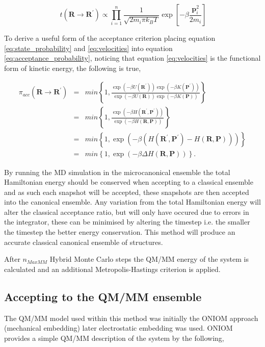 \begin{equation} \label{eq:velocities}
\ t(\textbf{R}\rightarrow\textbf{R}^{\prime}) \propto \prod_{i=1}^{n} \frac{1}{\sqrt{2 m_i \pi k_B T}} \exp \left[ -\beta \frac{\textbf{p}_{i}^2}{2m_i} \right]
\end{equation}

To derive a useful form of the acceptance criterion placing equation \ref{eq:state_probability} and \ref{eq:velocities} into equation \ref{eq:acceptance_probability}, noticing that equation \ref{eq:velocities} is the functional form of kinetic energy, the following is true,

\begin{eqnarray}
\pi_{acc}(\textbf{R}\rightarrow\textbf{R}^{\prime}) &=& min \left\{ 1, \frac{\exp (-\beta U(\textbf{R}^\prime))\exp(-\beta K(\textbf{P}^\prime))}{\exp (-\beta U(\textbf{R}))\exp(-\beta K(\textbf{P}))} \right\} \nonumber \\
&=&min \left\{ 1, \frac{\exp (-\beta H(\textbf{R}^\prime,\textbf{P}^\prime))}{\exp (-\beta H(\textbf{R},\textbf{P}))} \right\} \nonumber \\
\ &=&  min \left\{ 1, \exp (-\beta (H(\textbf{R}^\prime,\textbf{P}^\prime)-H(\textbf{R},\textbf{P}))) \right\} \nonumber \\ \label{eq:hamiltonian_acceptance}
\ &=& min \left\{1,\exp(-\beta\Delta H(\textbf{R},\textbf{P})) \right\} .
\end{eqnarray}

By running the MD simulation in the microcanonical ensemble the total Hamiltonian energy should be conserved when accepting to a classical ensemble and as such each snapshot will be accepted, these snapshots are then accepted into the canonical ensemble.  Any variation from the total Hamiltonian energy will alter the classical acceptance ratio, but will only have occured due to errors in the integrator, these can be minimised by altering the timestep i.e. the smaller the timestep the better energy conservation.  This method will produce an accurate classical canonical ensemble of structures.

After $n_{Max MM}$ Hybrid Monte Carlo steps the QM/MM energy of the system is calculated and an additional Metropolis-Hastings criterion is applied.

\subsection{Accepting to the QM/MM ensemble}

The QM/MM model used within this method was initially the ONIOM approach (mechanical embedding)\cite{oniom} later electrostatic embedding was used.  ONIOM provides a simple QM/MM description of the system by the following,

